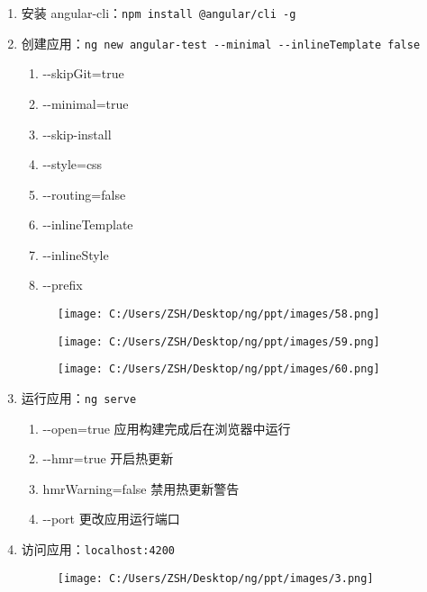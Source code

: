 \documentclass[
]{article}
\begin{document}
\begin{enumerate}
\def\labelenumi{\arabic{enumi}.}
\item
  安装 angular-cli：\texttt{npm\ install\ @angular/cli\ -g}
\item
  创建应用：\texttt{ng\ new\ angular-test\ -\/-minimal\ -\/-inlineTemplate\ false}

  \begin{enumerate}
  \def\labelenumii{\arabic{enumii}.}
  \item
    -\/-skipGit=true
  \item
    -\/-minimal=true
  \item
    -\/-skip-install
  \item
    -\/-style=css
  \item
    -\/-routing=false
  \item
    -\/-inlineTemplate
  \item
    -\/-inlineStyle
  \item
    -\/-prefix
  \end{enumerate}

  \begin{figure}
  \centering
  \texttt{[image: C:/Users/ZSH/Desktop/ng/ppt/images/58.png]}
  \caption{}
  \end{figure}

  \begin{figure}
  \centering
  \texttt{[image: C:/Users/ZSH/Desktop/ng/ppt/images/59.png]}
  \caption{}
  \end{figure}

  \begin{figure}
  \centering
  \texttt{[image: C:/Users/ZSH/Desktop/ng/ppt/images/60.png]}
  \caption{}
  \end{figure}
\item
  运行应用：\texttt{ng\ serve}

  \begin{enumerate}
  \def\labelenumii{\arabic{enumii}.}
  \item
    -\/-open=true 应用构建完成后在浏览器中运行
  \item
    -\/-hmr=true 开启热更新
  \item
    hmrWarning=false 禁用热更新警告
  \item
    -\/-port 更改应用运行端口
  \end{enumerate}
\item
  访问应用：\texttt{localhost:4200}

  \begin{figure}
  \centering
  \texttt{[image: C:/Users/ZSH/Desktop/ng/ppt/images/3.png]}
  \caption{}
  \end{figure}
\end{enumerate}
\end{document}
